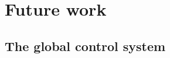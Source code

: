 
\newpage
\section{Future work}
\label{sec:future}
\begin{colsection}


\begin{colsection}

\citep{GW150914, GW150914_followup, GW151226}

\end{colsection}


\subsection{The global control system}
\label{sec:gtecs_multisite}
\begin{colsection}


\end{colsection}


\end{colsection}

